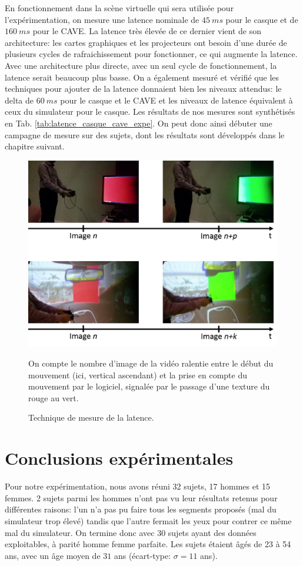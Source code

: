 	\par En fonctionnement dans la scène virtuelle qui sera utilisée pour l'expérimentation, on mesure une latence nominale de $45~ms$ pour le casque et de $160~ms$ pour le CAVE. La latence très élevée de ce dernier vient de son architecture: les cartes graphiques et les projecteurs ont besoin d'une durée de plusieurs cycles de rafraichissement pour fonctionner, ce qui augmente la latence. Avec une architecture plus directe, avec un seul cycle de fonctionnement, la latence serait beaucoup plus basse. On a également mesuré et vérifié que les techniques pour ajouter de la latence donnaient bien les niveaux attendus: le delta de $60~ms$ pour le casque et le CAVE et les niveaux de latence équivalent à ceux du simulateur pour le casque. Les résultats de nos mesures sont synthétisés en Tab. \ref{tab:latence_casque_cave_expe}. On peut donc ainsi débuter une campagne de mesure sur des sujets, dont les résultats sont développés dans le chapitre suivant.
	
	\begin{figure}[h]
		\centering
		\includegraphics[scale=.8]{Figures/LatencyMeasureTechnique}
		\caption{Technique de mesure de la latence.}{On compte le nombre d'image de la vidéo ralentie entre le début du mouvement (ici, vertical ascendant) et la prise en compte du mouvement par le logiciel, signalée par le passage d'une texture du rouge au vert.}
		\label{fig:mesure_latence_video}
	\end{figure}
	
\chapter{Conclusions expérimentales}
	\par Pour notre expérimentation, nous avons réuni 32 sujets, 17 hommes et 15 femmes. 2 sujets parmi les hommes n'ont pas vu leur résultats retenus pour différentes raisons: l'un n'a pas pu faire tous les segments proposés (mal du simulateur trop élevé) tandis que l'autre fermait les yeux pour contrer ce même mal du simulateur. On termine donc avec 30 sujets ayant des données exploitables, à parité homme femme parfaite. Les sujets étaient âgés de 23 à 54 ans, avec un âge moyen de $31$ ans (écart-type: $\sigma = 11$ ans).
	
